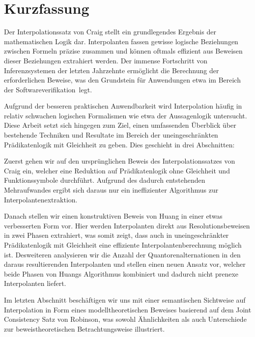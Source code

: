 \chapter*{Kurzfassung}

Der Interpolationssatz von Craig stellt ein grundlegendes Ergebnis der mathematischen Logik dar. Interpolanten fassen gewisse logische Beziehungen zwischen Formeln präzise zusammen und können oftmals effizient aus Beweisen dieser Beziehungen extrahiert werden. Der immense Fortschritt von Inferenzsystemen der letzten Jahrzehnte ermöglicht die Berechnung der erforderlichen Beweise, was den Grundstein für Anwendungen etwa im Bereich der Softwareverifikation~legt.

Aufgrund der besseren praktischen Anwendbarkeit wird Interpolation häufig in relativ schwachen logischen Formalismen wie etwa der Aussagenlogik untersucht. Diese Arbeit setzt sich hingegen zum Ziel, einen umfassenden Überblick über bestehende Techniken und Resultate im Bereich der uneingeschränkten Prädikatenlogik mit Gleichheit zu geben. Dies geschieht in drei Abschnitten:

Zuerst gehen wir auf den ursprünglichen Beweis des Interpolationssatzes von Craig ein, welcher eine Reduktion auf Prädikatenlogik ohne Gleichheit und Funktionssymbole durchführt.
Aufgrund des dadurch entstehenden Mehraufwandes ergibt sich daraus nur ein ineffizienter Algorithmus zur Interpolantenextraktion.

Danach stellen wir einen konstruktiven Beweis von Huang in einer etwas verbesserten Form vor. Hier werden Interpolanten direkt aus Resolutionsbeweisen in zwei Phasen extrahiert, was somit zeigt, dass auch in uneingeschränkter Prädikatenlogik mit Gleichheit eine effiziente Interpolantenberechnung möglich ist. Desweiteren analysieren wir die Anzahl der Quantorenalternationen in den daraus resultierenden Interpolanten und stellen einen neuen Ansatz vor, welcher beide Phasen von Huangs Algorithmus kombiniert und dadurch nicht prenexe Interpolanten liefert.

Im letzten Abschnitt beschäftigen wir uns mit einer semantischen Sichtweise auf Interpolation in Form eines modelltheoretischen Beweises basierend auf dem Joint Consistency Satz von Robinson, was sowohl Ähnlichkeiten als auch Unterschiede zur beweistheoretischen Betrachtungsweise illustriert.
